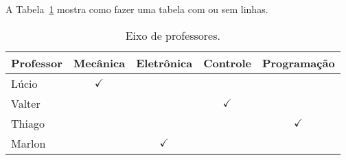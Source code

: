 A Tabela~\ref{tbl:exemplo} mostra como fazer uma tabela com ou sem linhas.

\begin{table}[ht!]
  \centering
  \begin{tabular}{l|cccc}
    \toprule
    Professor & Mecânica       & Eletrônica     & Controle       & Programação    \\ \midrule
    Lúcio     & \(\checkmark\) &                &                &                \\
    Valter    &                &                & \(\checkmark\) &                \\
    Thiago    &                &                &                & \(\checkmark\) \\
    Marlon    &                & \(\checkmark\) &                &                \\
    \bottomrule
  \end{tabular}
  \caption{Eixo de professores.}%
  \label{tbl:exemplo}
\end{table}
